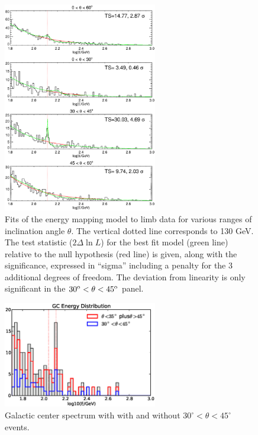 \documentclass[aps,twocolumn,prd,superscriptaddress,showpacs,nofootinbib,fixfloat]{revtex4}
\newcommand{\degree}{^{\rm o}}
\begin{document}
\begin{figure}[p]
\centering
\includegraphics[width=0.6\textwidth]{plots/limbfits.ps}
\caption{Fits of the energy mapping model to limb data for various ranges of
  inclination angle $\theta$.  The vertical dotted line corresponds to 130
  GeV.  The test statistic ($2\Delta\ln L$) for the best fit model (green
  line) relative to the null hypothesis (red line) is given, along with the
  significance, expressed in ``sigma'' including a penalty for the 3
  additional degrees of freedom.  The deviation from linearity is only
  significant in the $30\degree < \theta < 45\degree$ panel.}
\label{fig:limbfits}
\end{figure}

\begin{figure}[p]
\centering
\includegraphics[width=0.6\textwidth]{plots/gc_energy.eps}
\caption{Galactic center spectrum with with and without
$30^\circ<\theta<45^\circ$ events.}
\label{fig:GCevents}
\end{figure}
\end{document}

